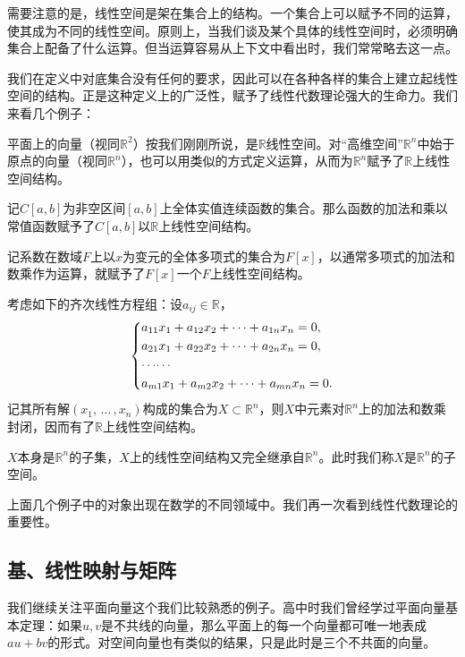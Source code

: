 需要注意的是，线性空间是架在集合上的结构。一个集合上可以赋予不同的运算，使其成为不同的线性空间。原则上，当我们谈及某个具体的线性空间时，必须明确集合上配备了什么运算。但当运算容易从上下文中看出时，我们常常略去这一点。

我们在定义中对底集合没有任何的要求，因此可以在各种各样的集合上建立起线性空间的结构。正是这种定义上的广泛性，赋予了线性代数理论强大的生命力。我们来看几个例子：

平面上的向量（视同$\mathbb{R}^2$）按我们刚刚所说，是$\mathbb{R}$线性空间。对“高维空间”$\mathbb{R}^n$中始于原点的向量（视同$\mathbb{R}^n$），也可以用类似的方式定义运算，从而为$\mathbb{R}^n$赋予了$\mathbb{R}$上线性空间结构。

记$C[a,b]$为非空区间$[a,b]$上全体实值连续函数的集合。那么函数的加法和乘以常值函数赋予了$C[a,b]$以$\mathbb{R}$上线性空间结构。

记系数在数域$F$上以$x$为变元的全体多项式的集合为$F[x]$，以通常多项式的加法和数乘作为运算，就赋予了$F[x]$一个$F$上线性空间结构。

考虑如下的齐次线性方程组：设$a_{ij}\in\mathbb{R}$，
\[
    \begin{dcases}
        a_{11}x_1+a_{12}x_2+\cdots+a_{1n}x_n=0, \\
        a_{21}x_1+a_{22}x_2+\cdots+a_{2n}x_n=0, \\
        \mathord{\cdots}\mathord{\cdots}        \\
        a_{m1}x_1+a_{m2}x_2+\cdots +a_{mn}x_n=0.
    \end{dcases}
\]
记其所有解$(x_1,\,\dots\,,x_n)$构成的集合为$X\subset \mathbb{R}^n$，则$X$中元素对$\mathbb{R}^n$上的加法和数乘封闭，因而有了$\mathbb{R}$上线性空间结构。

$X$本身是$\mathbb{R}^n$的子集，$X$上的线性空间结构又完全继承自$\mathbb{R}^n$。此时我们称$X$是$\mathbb{R}^n$的子空间。

上面几个例子中的对象出现在数学的不同领域中。我们再一次看到线性代数理论的重要性。

\subsection{基、线性映射与矩阵}
我们继续关注平面向量这个我们比较熟悉的例子。高中时我们曾经学过平面向量基本定理：如果$u,v$是不共线的向量，那么平面上的每一个向量都可唯一地表成$au+bv$的形式。对空间向量也有类似的结果，只是此时是三个不共面的向量。

\begin{center}
\end{center}


